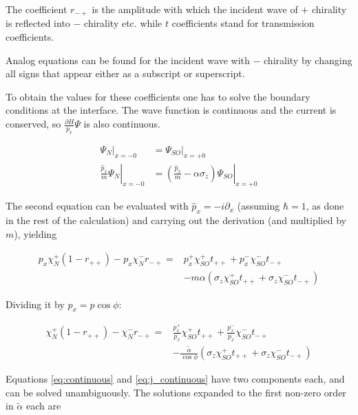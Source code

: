\documentclass[11pt]{article}
\newcommand{\ta}{\tilde \alpha}
\begin{document}
The coefficient $r_{-+}$ is the amplitude with which the incident wave
of $+$ chirality is reflected into $-$ chirality etc. while $t$
coefficients stand for transmission coefficients.

Analog equations can be found for the incident wave with $-$ chirality
by changing all signs that appear either as a subscript or
superscript.

To obtain the values for these coefficients one has to solve the
boundary conditions at the interface. The wave function is continuous
and the current is conserved, so $\frac{\partial H}{p_x} \Psi$ is also
continuous.

\begin{align}
    \Psi_N|_{x = -0}    &= \Psi_{SO}|_{x = +0} \label{eq:continuous}\\
    \left.\frac{\hat p_x}{m} \Psi_N\right|_{x = -0}
                        &= \left. \left(\frac{\hat p_x}{m} -\alpha \sigma_z\right)
                                \Psi_{SO}\right|_{x = +0}
\end{align}

The second equation can be evaluated with $\hat p_x = -i \partial_x$
(assuming $\hbar = 1$, as done in the rest of the calculation) and
carrying out the derivation (and multiplied by $m$), yielding

\begin{align}
    p_x \chi_N^+ (1 - r_{++}) - p_x \chi_N^- r_{-+}
        =& p_x^+ \chi_{SO}^+ t_{++} + p_x^- \chi_{SO}^- t_{-+} \nonumber\\
         &   - m \alpha \left(  \sigma_z \chi_{SO}^+ t_{++}
                            + \sigma_z \chi_{SO}^- t_{-+} \right)
\end{align}

Dividing it by  $p_x = p \cos \phi$: 

\begin{align}
    \chi_N^+ (1 - r_{++}) - \chi_N^- r_{-+}
        =& \frac{p_x^+}{p_x} \chi_{SO}^+ t_{++} + \frac{p_x^-}{p_x} \chi_{SO}^- t_{-+} \nonumber\\
         &   - \frac{\ta}{\cos \phi} \left(\sigma_z \chi_{SO}^+
                 t_{++} + \sigma_z \chi_{SO}^- t_{-+} \right)
                                \label{eq:j_continuous}
\end{align}

Equations \ref{eq:continuous} and \ref{eq:j_continuous} have two
components each, and can be solved unambiguously. 
The solutions expanded to the first non-zero order in $\ta$ each are
\end{document}
